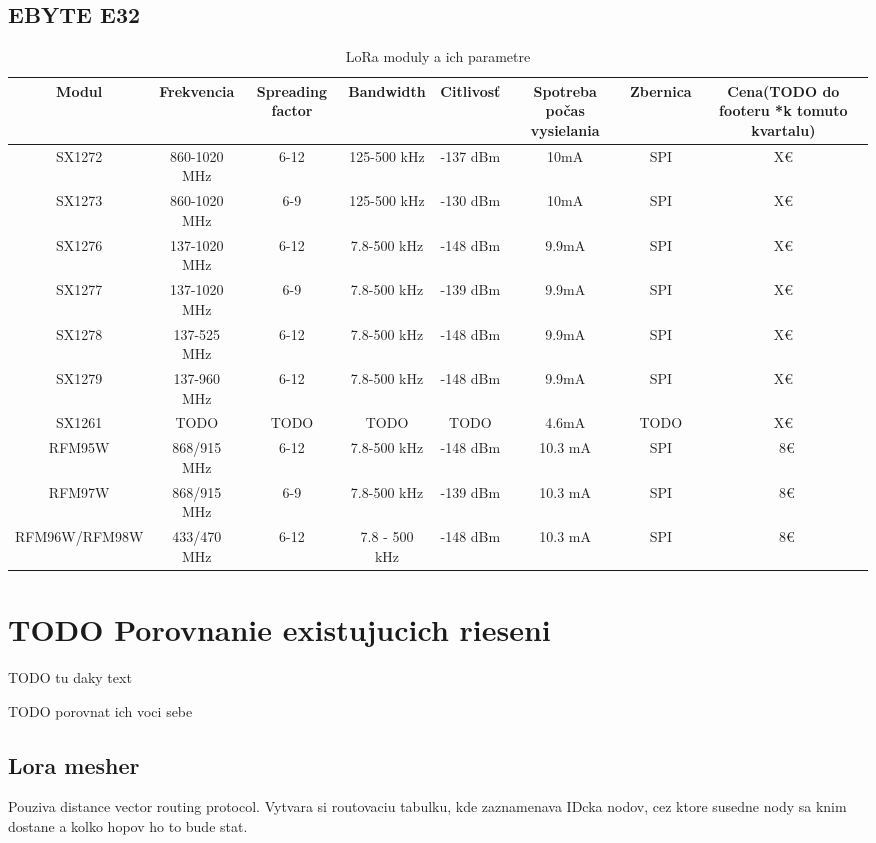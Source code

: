 \documentclass[slovak,master]{diploma}
\begin{document}
\section {EBYTE E32}



\begin{table}
	\centering
  \small
  \setlength\tabcolsep{2pt}
	\caption[Parametre LoRa modulov]{LoRa moduly a ich parametre}
  \begin{tabular}{c|c|c|c|c|c|c|c}
    \toprule %
    Modul & Frekvencia & Spreading factor & Bandwidth & Citlivosť & Spotreba počas vysielania & Zbernica & Cena(TODO do footeru *k tomuto kvartalu)\\
    \midrule
    SX1272 & 860-1020 MHz & 6-12 & 125-500 kHz & -137 dBm & 10mA & SPI & X€ \\ 
    SX1273 & 860-1020 MHz & 6-9 & 125-500 kHz & -130 dBm & 10mA & SPI & X€ \\
    SX1276 & 137-1020 MHz & 6-12 & 7.8-500 kHz & -148 dBm & 9.9mA & SPI & X€ \\
    SX1277 & 137-1020 MHz & 6-9 & 7.8-500 kHz & -139 dBm & 9.9mA & SPI & X€ \\
    SX1278 & 137-525 MHz & 6-12 & 7.8-500 kHz & -148 dBm & 9.9mA & SPI & X€ \\
    SX1279 & 137-960 MHz & 6-12 & 7.8-500 kHz & -148 dBm & 9.9mA & SPI & X€ \\
    SX1261 & TODO & TODO & TODO & TODO & 4.6mA & TODO & X€ \\
    RFM95W & 868/915 MHz & 6-12 & 7.8-500 kHz & -148 dBm & 10.3 mA & SPI & ~8€ \\
    RFM97W & 868/915 MHz & 6-9 & 7.8-500 kHz & -139 dBm & 10.3 mA & SPI & ~8€ \\
    RFM96W/RFM98W & 433/470 MHz & 6-12 & 7.8 - 500 kHz & -148 dBm & 10.3 mA & SPI & ~8€ \\
    \midrule
  \end{tabular}
\end{table}


\chapter{TODO Porovnanie existujucich rieseni}
TODO tu daky text

TODO porovnat ich voci sebe

\section{Lora mesher}
Pouziva distance vector routing protocol.
Vytvara si routovaciu tabulku, kde zaznamenava IDcka nodov, cez ktore susedne nody sa knim dostane a kolko hopov ho to bude stat.
\end{document}
